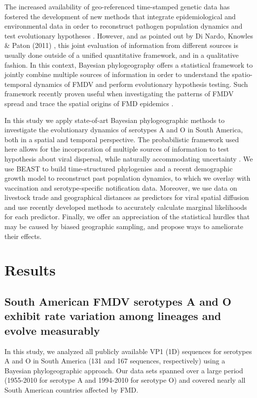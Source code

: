 \documentclass[10pt]{article}
\begin{document}
The increased availability of geo-referenced time-stamped genetic data has fostered the development of new methods that integrate epidemiological and environmental data in order to reconstruct pathogen population dynamics and test evolutionary hypotheses \cite{MEP,grenfell}. 
However, and as pointed out by Di Nardo, Knowles \&  Paton (2011) \cite{combining}, this joint evaluation of information from different sources is usually done outside of a unified quantitative framework, and in a qualitative fashion. In this context, Bayesian phylogeography offers a statistical framework to jointly combine multiple sources of information in order to understand the spatio-temporal dynamics of FMDV and perform evolutionary hypothesis testing. Such framework recently proven useful when investigating the patterns of FMDV spread and trace the spatial origins of FMD epidemics \cite{Carvalho2012,bulgaria,phymal}.

In this study we apply state-of-art Bayesian phylogeographic methods
to investigate the evolutionary dynamics of serotypes A and O in South America, both in a spatial and temporal perspective. The probabilistic framework used here allows for the incorporation of multiple sources of information to test hypothesis about viral dispersal, while naturally accommodating uncertainty \cite{roots,towards}.
We use BEAST \cite{beast2012} to build time-structured phylogenies and a recent demographic growth model \cite{skyride} to reconstruct past population dynamics, to which we overlay with vaccination and serotype-specific notification data.
Moreover, we use data on livestock trade and geographical distances as predictors for viral spatial diffusion and use recently developed methods to accurately calculate marginal likelihoods for each predictor.
Finally, we offer an appreciation of the statistical hurdles that may be caused by biased geographic sampling, and propose ways to ameliorate their effects.
\section*{Results}

\subsection*{South American FMDV serotypes A and O exhibit rate variation among lineages and evolve measurably}

In this study, we analyzed all publicly available VP1 (1D) sequences for serotypes A and O in South America (131 and 167 sequences, respectively) using a Bayesian phylogeographic approach. Our data sets spanned over a large period (1955-2010 for serotype A and 1994-2010 for serotype O)  and covered nearly all South American countries affected by FMD.
\end{document}
